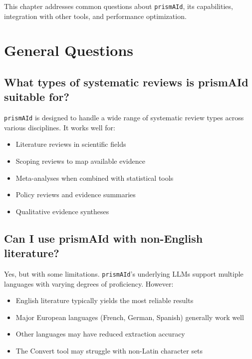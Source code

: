 This chapter addresses common questions about \texttt{prismAId}, its capabilities, integration with other tools, and performance optimization.

\section{General Questions}

\subsection{What types of systematic reviews is prismAId suitable for?}

\texttt{prismAId} is designed to handle a wide range of systematic review types across various disciplines. It works well for:

\begin{itemize}
    \item Literature reviews in scientific fields
    \item Scoping reviews to map available evidence
    \item Meta-analyses when combined with statistical tools
    \item Policy reviews and evidence summaries
    \item Qualitative evidence syntheses
\end{itemize}


\subsection{Can I use prismAId with non-English literature?}

Yes, but with some limitations. \texttt{prismAId}'s underlying LLMs support multiple languages with varying degrees of proficiency. However:

\begin{itemize}
    \item English literature typically yields the most reliable results
    \item Major European languages (French, German, Spanish) generally work well
    \item Other languages may have reduced extraction accuracy
    \item The Convert tool may struggle with non-Latin character sets
\end{itemize}

